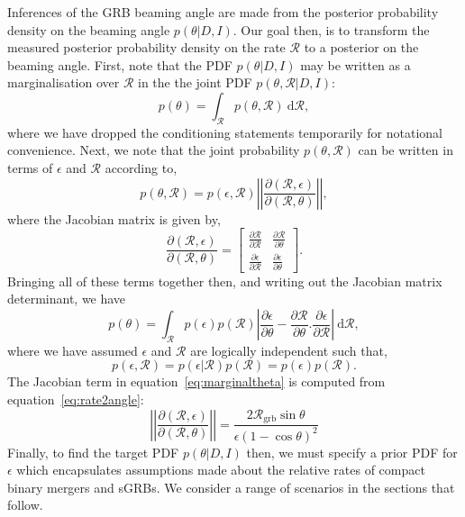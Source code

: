 \documentclass[twocolumn,nofootinbib]{revtex4}
\newcommand{\grbRate}{{{\mathcal R}_{\mathrm{grb}}}}
\newcommand{\cbcrate}{{{\mathcal R}}}
\newcommand{\diff}{{\mathrm d}}
\begin{document}
Inferences of the GRB beaming angle are made from the posterior probability
density on the beaming angle $p(\theta|D,I)$.  Our goal then, is to transform
the measured posterior probability density on the rate $\cbcrate$ to a posterior
on the beaming angle.
%
First, note that the PDF $p(\theta|D,I)$ may be written as a marginalisation
over $\cbcrate$ in the the joint PDF $p(\theta, \cbcrate|D,I)$:
%
\begin{equation}
p(\theta) = \int_{\cbcrate} p(\theta,\cbcrate)~\diff \cbcrate,
\end{equation}
%
where we have dropped the conditioning statements temporarily for notational
convenience.  Next, we note that the joint probability $p(\theta,\cbcrate)$ can
be written in terms of $\epsilon$ and $\cbcrate$ according to,
%
\begin{equation}
p(\theta,\cbcrate) = p(\epsilon,\cbcrate)
\left\lvert\left\lvert
\frac{\partial(\cbcrate,\epsilon)}{\partial(\cbcrate,\theta)}
\right\rvert\right\rvert,
\end{equation}
%
where the Jacobian matrix is given by,
%
\begin{equation}
\frac{\partial (\cbcrate,\epsilon)}{\partial(\cbcrate,\theta)} =
\begin{bmatrix}
\frac{\partial \cbcrate}{\partial \cbcrate} & \frac{\partial \cbcrate}{\partial \theta} \\
\frac{\partial \epsilon}{\partial \cbcrate} & \frac{\partial \epsilon}{\partial \theta}
\end{bmatrix}.
\end{equation}
%
Bringing all of these terms together then, and writing out the Jacobian matrix
determinant, we have
%
\begin{equation}\label{eq:marginaltheta}
p(\theta) = \int_{\cbcrate} p(\epsilon)p(\cbcrate) \left\lvert
\frac{\partial\epsilon}{\partial\theta} - \frac{\partial\cbcrate}{\partial\theta}.\frac{\partial\epsilon}{\partial\cbcrate}\right\rvert~\diff
\cbcrate,
\end{equation}
%
where we have assumed $\epsilon$ and $\cbcrate$ are logically independent such
that,
\begin{equation}
p(\epsilon,\cbcrate) = p(\epsilon|\cbcrate)p(\cbcrate) = p(\epsilon)p(\cbcrate).
\end{equation}
%
The Jacobian term in equation~\ref{eq:marginaltheta} is computed from
equation~\ref{eq:rate2angle}:
%
\begin{equation}
\left\lvert\left\lvert
\frac{\partial(\cbcrate,\epsilon)}{\partial(\cbcrate,\theta)}
\right\rvert\right\rvert =
\frac{2\grbRate \sin \theta}{\epsilon(1-\cos\theta)^2}
\end{equation}
%
Finally, to find the target PDF $p(\theta|D,I)$
then, we must specify a prior PDF for $\epsilon$ which encapsulates
assumptions made about the relative rates of compact binary mergers and sGRBs.
We consider a range of scenarios in the sections that follow.
 
\end{document}
